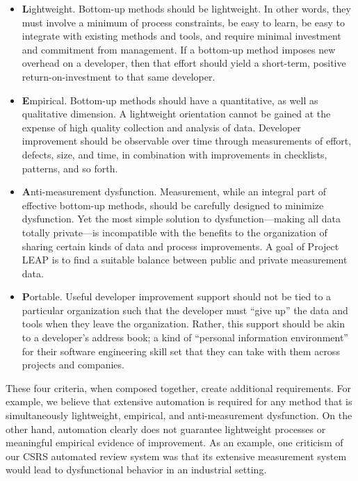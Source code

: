 \begin{itemize}
  
\item {\bf L}ightweight. Bottom-up methods should be light\-weight.  In
  other words, they must involve a minimum of process constraints, be easy
  to learn, be easy to integrate with existing methods and tools, and require
  minimal investment and commitment from management. If a bottom-up method
  imposes new overhead on a developer, then that effort should yield a
  short-term, positive return-on-investment to that same developer.
  
\item {\bf E}mpirical. Bottom-up methods should have a quantitative, as
  well as qualitative dimension.  A lightweight orientation cannot be
  gained at the expense of high quality collection and analysis of data.
  Developer improvement should be observable over time through measurements
  of effort, defects, size, and time, in combination with improvements in checklists, 
  patterns, and so forth.
  
\item {\bf A}nti-measurement dysfunction.   Measurement, while an
  integral part of effective bottom-up methods, should be carefully
  designed to minimize dysfunction.  Yet the most simple solution to
  dysfunction---making all data totally private---is incompatible with the
  benefits to the organization of sharing certain kinds of data and process
  improvements. A goal of Project LEAP is to find a suitable balance between
  public and private measurement data.
  
\item {\bf P}ortable. 
  Useful developer improvement support should not be tied to a particular
  organization such that the developer must ``give up'' the data and tools
  when they leave the organization. Rather, this support should be akin to a
  developer's address book; a kind of ``personal information environment''
  for their software engineering skill set that they can take with them
  across projects and companies.

\end{itemize}

These four criteria, when composed together, create additional
requirements. For example, we believe that extensive automation is required
for any method that is simultaneously lightweight, empirical, and
anti-measurement dysfunction.  On the other hand, automation clearly does
not guarantee lightweight processes or meaningful empirical evidence of
improvement. As an example, one criticism of our CSRS automated review
system \cite{Johnson94} was that its extensive measurement system would
lead to dysfunctional behavior in an industrial setting.


